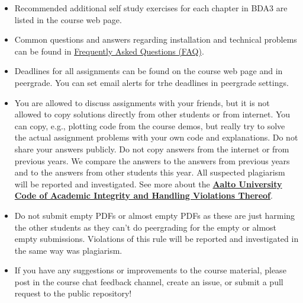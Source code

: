 \begin{itemize}
\item Recommended additional self study exercises for each chapter in BDA3 are listed in the course web page.
\item Common questions and answers regarding installation and technical problems can be found in \href{https://avehtari.github.io/BDA_course_Aalto/FAQ.html}{Frequently Asked Questions (FAQ)}.
\item Deadlines for all assignments can be found on the course web page and in peergrade. You can set email alerts for trhe deadlines in peergrade settings.
\item You are allowed to discuss assignments with your friends, but it is not allowed to copy solutions directly from other students or from internet. You can copy, e.g., plotting code from the course demos, but really try to solve the actual assignment problems with your own code and explanations. Do not share your answers publicly. Do not copy answers from the internet or from previous years. We compare the answers to the answers from previous years and to the answers from other students this year. All suspected plagiarism will be reported and investigated. See more about the \href{https://into.aalto.fi/display/ensaannot/Aalto+University+Code+of+Academic+Integrity+and+Handling+Violations+Thereof}{\textbf{Aalto University Code of Academic Integrity and Handling Violations Thereof}}.
\item Do not submit empty PDFs or almost empty PDFs as these are just harming the other students as they can't do peergrading for the empty or almost empty submissions. Violations of this rule will be reported and investigated in the same way was plagiarism.
\item If you have any suggestions or improvements to the course material, please post in the course chat feedback channel, create an issue, or submit a pull request to the public repository!
\end{itemize}
